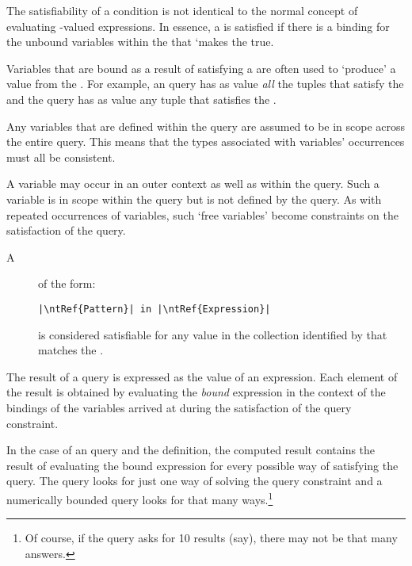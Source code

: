 The satisfiability of a condition is not identical to the normal concept of evaluating -valued expressions. In essence, a  is satisfied if there is a binding for the unbound variables within the  that `makes the  true.

Variables that are bound as a result of satisfying a  are often used to `produce' a value from the . For example, an  query has as value \emph{all} the tuples that satisfy the  and the  query has as value any tuple that satisfies the .

\begin{aside}
Any variables that are defined within the query are assumed to be in scope across the entire query. This means that the types associated with variables' occurrences must all be consistent.

A variable may occur in an outer context as well as within the query. Such a variable is in scope within the query but is not defined by the query. As with repeated occurrences of variables, such `free variables' become constraints on the satisfaction of the query.
\end{aside}

\begin{description}
\item[A ] of the form:
\begin{lstlisting}[escapechar=|]
|\ntRef{Pattern}| in |\ntRef{Expression}|
\end{lstlisting}
is considered satisfiable for any value in the collection identified by  that matches the . 
\end{description}


The result of a query is expressed as the value of an expression. Each element of the result is obtained by evaluating the \emph{bound} expression in the context of the bindings of the variables arrived at during the satisfaction of the query constraint.

In the case of an  query and the  definition, the computed result contains the result of evaluating the bound expression for every possible way of satisfying the query.  The  query looks for just one way of solving the query constraint and a numerically bounded query looks for that many ways.\footnote{Of course, if the query asks for 10 results (say), there may not be that many answers.}

